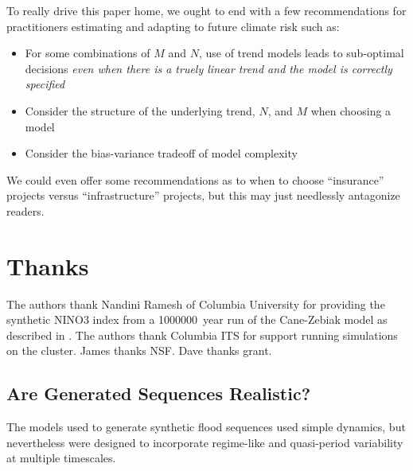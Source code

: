 \documentclass[12pt]{article}
\begin{document}
To really drive this paper home, we ought to end with a few recommendations for practitioners estimating and adapting to future climate risk such as:
\begin{itemize}
  \item For some combinations of $M$ and $N$, use of trend models leads to sub-optimal decisions \emph{even when there is a truely linear trend and the model is correctly specified}
  \item Consider the structure of the underlying trend, $N$, and $M$ when choosing a model
  \item Consider the bias-variance tradeoff of model complexity
\end{itemize}
We could even offer some recommendations as to when to choose ``insurance'' projects versus ``infrastructure'' projects, but this may just needlessly antagonize readers.

\appendix

\section{Thanks}

The authors thank Nandini Ramesh of Columbia University for providing the synthetic NINO3 index from a \SI{1000000}{year} run of the Cane-Zebiak model as described in \citet{Ramesh2017}.
The authors thank Columbia ITS for support running simulations on the cluster.
James thanks NSF.
Dave thanks grant.

\subsection{Are Generated Sequences Realistic?\label{sec:sequence-realistic}}

The models used to generate synthetic flood sequences used simple dynamics, but nevertheless were designed to incorporate regime-like and quasi-period variability at multiple timescales.
\end{document}

